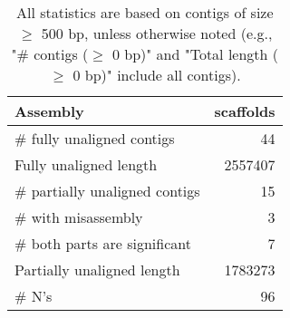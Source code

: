 \documentclass[12pt,a4paper]{article}
\begin{document}
\begin{table}[ht]
\begin{center}
\caption{All statistics are based on contigs of size $\geq$ 500 bp, unless otherwise noted (e.g., "\# contigs ($\geq$ 0 bp)" and "Total length ($\geq$ 0 bp)" include all contigs).}
\begin{tabular}{|l*{1}{|r}|}
\hline
Assembly & scaffolds \\ \hline
\# fully unaligned contigs & 44 \\ \hline
Fully unaligned length & 2557407 \\ \hline
\# partially unaligned contigs & 15 \\ \hline
\hspace{5mm}\# with misassembly & 3 \\ \hline
\hspace{5mm}\# both parts are significant & 7 \\ \hline
Partially unaligned length & 1783273 \\ \hline
\# N's & 96 \\ \hline
\end{tabular}
\end{center}
\end{table}
\end{document}
